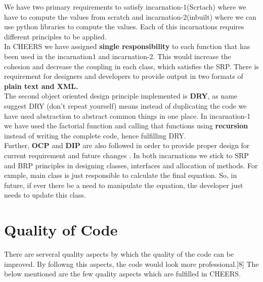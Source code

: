 \documentclass[11pt]{article}
\begin{document}
		We have two primary requirements to satisfy incarnation-1(Scrtach) where
		we have to compute the values from scratch and incarnation-2(inbuilt) where we can use python libraries to compute the values. Each of this incarnations requires different principles to be applied.\\
	
		In CHEERS we have assigned \textbf{single responsibility} to each function that has been used in the incarnation1 and incarnation-2. This would increase the cohesion and decrease the coupling in each class, which satisfies the SRP. There is requirement for designers and developers to provide output in two formats of \textbf{plain text and XML.}\\
	
		The second object oriented design principle implemented is	\textbf{DRY}, as name suggest DRY (don't repeat yourself) means instead of duplicating the code we have used abstraction to abstract common things in one place. In incarnation-1 we have used the factorial function and calling that functions using \textbf{recursion}	instead of writing the complete code, hence fulfilling DRY.\\
	
		Further, \textbf{OCP} and \textbf{DIP} are also followed in order to provide proper design for current requirement and future changes . In both incarnations we stick to SRP and BRP principles in designing classes, interfaces and allocation of methods. For exmple, main class is just responsible to calculate the final equation. So, in future, if ever there be a need to manipulate the equation, the developer just needs to update this class.
		
\section{Quality of Code}

		There are serveral quality aspects by which the quality of the code can be improved. By followng this aspects, the code would look more professional.[8]
		The below mentioned are the few quality aspects which are fulfilled in CHEERS.\\
		
\end{document}
